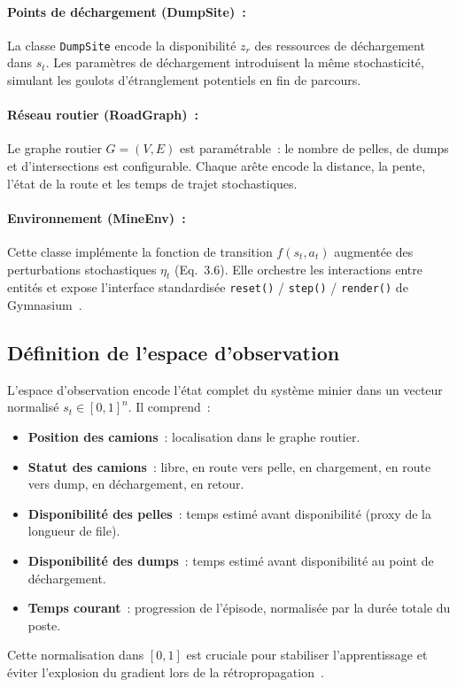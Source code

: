 \documentclass[11pt,a4paper]{report}
\begin{document}
\paragraph{Points de déchargement (DumpSite)~:}
La classe \texttt{DumpSite} encode la disponibilité $z_r$ des ressources de déchargement dans $s_t$. Les paramètres de déchargement introduisent la même stochasticité, simulant les goulots d'étranglement potentiels en fin de parcours.

\paragraph{Réseau routier (RoadGraph)~:}
Le graphe routier $G = (V, E)$ est paramétrable~: le nombre de pelles, de dumps et d'intersections est configurable. Chaque arête encode la distance, la pente, l'état de la route et les temps de trajet stochastiques.

\paragraph{Environnement (MineEnv)~:}
Cette classe implémente la fonction de transition $f(s_t, a_t)$ augmentée des perturbations stochastiques $\eta_t$ (Eq.~3.6). Elle orchestre les interactions entre entités et expose l'interface standardisée \texttt{reset()} / \texttt{step()} / \texttt{render()} de Gymnasium~\cite{Gymnasium}.

\subsection{Définition de l'espace d'observation}
\label{sec:espace-observation}
L'espace d'observation encode l'état complet du système minier dans un vecteur normalisé $s_t \in [0, 1]^n$. Il comprend~:
\begin{itemize}
    \item \textbf{Position des camions}~: localisation dans le graphe routier.
    \item \textbf{Statut des camions}~: libre, en route vers pelle, en chargement, en route vers dump, en déchargement, en retour.
    \item \textbf{Disponibilité des pelles}~: temps estimé avant disponibilité (proxy de la longueur de file).
    \item \textbf{Disponibilité des dumps}~: temps estimé avant disponibilité au point de déchargement.
    \item \textbf{Temps courant}~: progression de l'épisode, normalisée par la durée totale du poste.
\end{itemize}
Cette normalisation dans $[0, 1]$ est cruciale pour stabiliser l'apprentissage et éviter l'explosion du gradient lors de la rétropropagation~\cite{MoezKrichen2022}.
\end{document}
